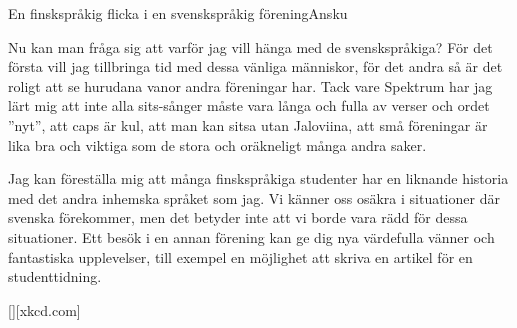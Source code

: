 \documentclass{spektraklet}
\begin{document}
\begin{artikel}{En finskspråkig flicka i en svenskspråkig förening}{Ansku}
\begin{twocolumns}
Nu kan man fråga sig att varför jag vill hänga med de svenskspråkiga? För det första vill jag tillbringa tid med dessa vänliga människor, för det andra så är det roligt att se hurudana vanor andra föreningar har. Tack vare Spektrum har jag lärt mig att inte alla sits-sånger måste vara långa och fulla av verser och ordet ”nyt”, att caps är kul, att man kan sitsa utan Jaloviina, att små föreningar är lika bra och viktiga som de stora och oräkneligt många andra saker.

Jag kan föreställa mig att många finskspråkiga studenter har en liknande historia med det andra inhemska språket som jag. Vi känner oss osäkra i situationer där svenska förekommer, men det betyder inte att vi borde vara rädd för dessa situationer. Ett besök i en annan förening kan ge dig nya värdefulla vänner och fantastiska upplevelser, till exempel en möjlighet att skriva en artikel för en studenttidning.

\end{twocolumns}

[][xkcd.com]

\end{artikel}
\end{document}
